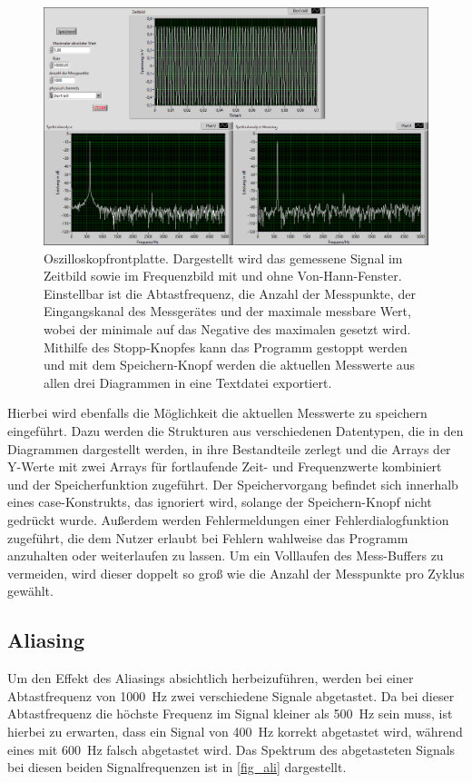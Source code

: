 \documentclass[
a4paper,
12pt,
pagesize,
ngerman
]{scrartcl}
\begin{document}
	\begin{figure}[H]  
		\includegraphics[width=1\textwidth]{EIRE2018Dateien/Tag3/ManuellVIp}
		\centering
		\caption{
			Oszilloskopfrontplatte. Dargestellt wird das gemessene Signal im Zeitbild sowie im Frequenzbild mit und ohne Von-Hann-Fenster. Einstellbar ist die Abtastfrequenz, die Anzahl der Messpunkte, der Eingangskanal des Messgerätes und der maximale messbare Wert, wobei der minimale auf das Negative des maximalen gesetzt wird.
			Mithilfe des Stopp-Knopfes kann das Programm gestoppt werden und mit dem Speichern-Knopf werden die aktuellen Messwerte aus allen drei Diagrammen in eine Textdatei exportiert.
		}
		\label{fig_tag23_oszi_manuell_front}
		\centering
	\end{figure}

	Hierbei wird ebenfalls die Möglichkeit die aktuellen Messwerte zu speichern eingeführt.
	Dazu werden die Strukturen aus verschiedenen Datentypen, die in den Diagrammen dargestellt werden, in ihre Bestandteile zerlegt und die Arrays der Y-Werte mit zwei Arrays für fortlaufende Zeit- und Frequenzwerte kombiniert und der Speicherfunktion zugeführt.
	Der Speichervorgang befindet sich innerhalb eines case-Konstrukts, das ignoriert wird, solange der Speichern-Knopf nicht gedrückt wurde.
	Außerdem werden Fehlermeldungen einer Fehlerdialogfunktion zugeführt, die dem Nutzer erlaubt bei Fehlern wahlweise das Programm anzuhalten oder weiterlaufen zu lassen.
	Um ein Volllaufen des Mess-Buffers zu vermeiden, wird dieser doppelt so groß wie die Anzahl der Messpunkte pro Zyklus gewählt.
	
	\subsection{Aliasing}
	Um den Effekt des Aliasings absichtlich herbeizuführen, werden bei einer Abtastfrequenz von \SI{1000}{\hertz} zwei verschiedene Signale abgetastet.
	Da bei dieser Abtastfrequenz die höchste Frequenz im Signal kleiner als \SI{500}{\hertz} sein muss, ist hierbei zu erwarten, dass ein Signal von \SI{400}{\hertz} korrekt abgetastet wird, während eines mit \SI{600}{\hertz} falsch abgetastet wird.
	Das Spektrum des abgetasteten Signals bei diesen beiden Signalfrequenzen ist in \cref{fig_ali} dargestellt.
	
\end{document}
